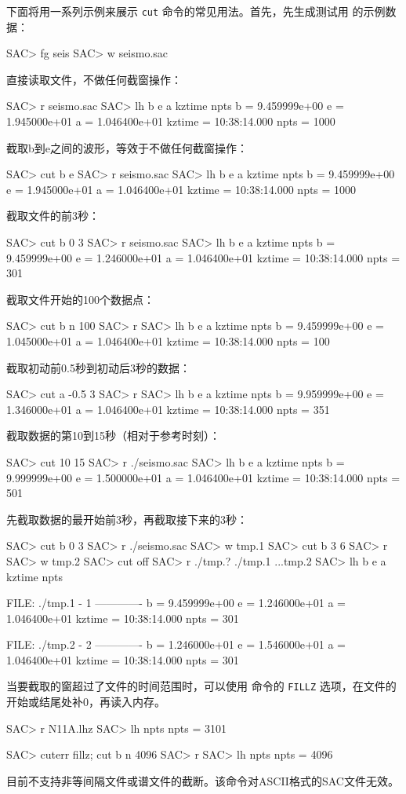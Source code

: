 下面将用一系列示例来展示 \texttt{cut} 命令的常见用法。首先，先生成测试用
的示例数据：
\begin{SACCode}
SAC> fg seis
SAC> w seismo.sac
\end{SACCode}
直接读取文件，不做任何截窗操作：
\begin{SACCode}
SAC> r seismo.sac
SAC> lh b e a kztime npts
          b = 9.459999e+00
          e = 1.945000e+01
          a = 1.046400e+01
     kztime = 10:38:14.000
       npts = 1000
\end{SACCode}
截取b到e之间的波形，等效于不做任何截窗操作：
\begin{SACCode}
SAC> cut b e
SAC> r seismo.sac
SAC> lh b e a kztime npts
          b = 9.459999e+00
          e = 1.945000e+01
          a = 1.046400e+01
     kztime = 10:38:14.000
       npts = 1000
\end{SACCode}
截取文件的前3秒：
\begin{SACCode}
SAC> cut b 0 3
SAC> r seismo.sac
SAC> lh b e a kztime npts
          b = 9.459999e+00
          e = 1.246000e+01
          a = 1.046400e+01
     kztime = 10:38:14.000
       npts = 301
\end{SACCode}
截取文件开始的100个数据点：
\begin{SACCode}
SAC> cut b n 100
SAC> r
SAC> lh b e a kztime npts
          b = 9.459999e+00
          e = 1.045000e+01
          a = 1.046400e+01
     kztime = 10:38:14.000
       npts = 100
\end{SACCode}
截取初动前0.5秒到初动后3秒的数据：
\begin{SACCode}
SAC> cut a -0.5 3
SAC> r
SAC> lh b e a kztime npts
          b = 9.959999e+00
          e = 1.346000e+01
          a = 1.046400e+01
     kztime = 10:38:14.000
       npts = 351
\end{SACCode}
截取数据的第10到15秒（相对于参考时刻）：
\begin{SACCode}
SAC> cut 10 15
SAC> r ./seismo.sac
SAC> lh b e a kztime npts
          b = 9.999999e+00
          e = 1.500000e+01
          a = 1.046400e+01
     kztime = 10:38:14.000
       npts = 501
\end{SACCode}

先截取数据的最开始前3秒，再截取接下来的3秒：
\begin{SACCode}
SAC> cut b 0 3
SAC> r ./seismo.sac
SAC> w tmp.1
SAC> cut b 3 6
SAC> r
SAC> w tmp.2
SAC> cut off
SAC> r ./tmp.?
./tmp.1 ...tmp.2
SAC> lh b e a kztime npts

  FILE: ./tmp.1 - 1
 -------------
          b = 9.459999e+00
          e = 1.246000e+01
          a = 1.046400e+01
     kztime = 10:38:14.000
       npts = 301

  FILE: ./tmp.2 - 2
 -------------
          b = 1.246000e+01
          e = 1.546000e+01
          a = 1.046400e+01
     kztime = 10:38:14.000
       npts = 301
\end{SACCode}

当要截取的窗超过了文件的时间范围时，可以使用  命令的
\texttt{FILLZ} 选项，在文件的开始或结尾处补0，再读入内存。
\begin{SACCode}
SAC> r N11A.lhz
SAC> lh npts
    npts = 3101

SAC> cuterr fillz; cut b n 4096
SAC> r
SAC> lh npts
    npts = 4096
\end{SACCode}

目前不支持非等间隔文件或谱文件的截断。该命令对ASCII格式的SAC文件无效。
